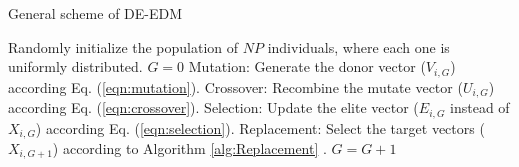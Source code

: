 \begin{algorithm}[t]
  \scriptsize
	\caption{General scheme of DE-EDM} 
	\begin{algorithmic}[1]
	\STATE Randomly initialize the population of $NP$ individuals, where each one is uniformly distributed.
	\STATE $G=0$
		\STATE Mutation: Generate the donor vector ($V_{i,G}$) according Eq. (\ref{eqn:mutation}).
		\STATE Crossover: Recombine the mutate vector ($U_{i,G}$) according Eq. (\ref{eqn:crossover}).
		\STATE Selection: Update the elite vector ($E_{i,G}$ instead of $X_{i,G}$) according Eq. (\ref{eqn:selection}).
		\STATE Replacement: Select the target vectors ($X_{i,G+1}$) according to Algorithm \ref{alg:Replacement} .
	   \ENDFOR
	   \STATE $G=G+1$
	\ENDWHILE
    \label{alg:DEEDM}
\end{algorithmic}
\end{algorithm}

%
%
%
%
%
%
%
%
%


